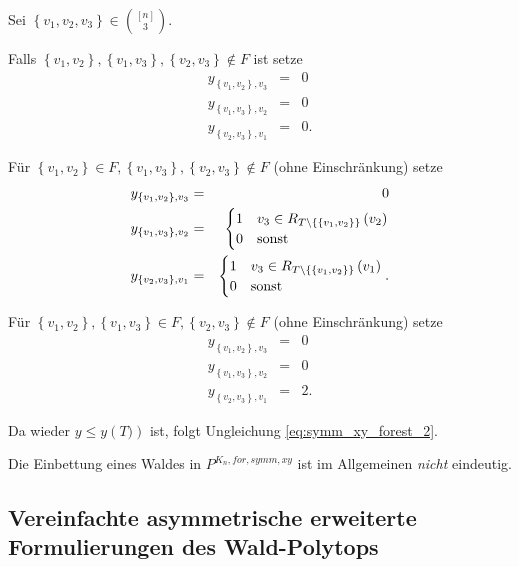 \documentclass[10p,a4paper,BCOR = 12mm, DIV=15]{scrbook}
\begin{document}
{\begin{bew}
Sei $\left\{v_1, v_2, v_3\right\} \in {\left[n\right] \choose 3}$.

Falls $\left\{v_1, v_2\right\}, \left\{v_1, v_3\right\}, \left\{v_2, v_3\right\} \notin   F$ ist setze
\begin{eqnarray*}
y_{\left\{v_1, v_2\right\}, v_3} & = & 0 \\
y_{\left\{v_1, v_3\right\}, v_2} & = & 0 \\
y_{\left\{v_2, v_3\right\}, v_1} & = & 0.
\end{eqnarray*}

Für $\left\{v_1, v_2\right\} \in F, \left\{v_1, v_3\right\}, \left\{v_2, v_3\right\} \notin  F$ (ohne Einschränkung) setze
\begin{eqnarray*}
y_{\left\{v_1, v_2\right\}, v_3} & = & 0 \\
y_{\left\{v_1, v_3\right\}, v_2} & = & \begin{cases}
1 & v_3\in R_{T\backslash \left\{\left\{v_1, v_2\right\}\right\}}\left(v_2\right) \\
0 & \textnormal{sonst}
\end{cases} \\
y_{\left\{v_2, v_3\right\}, v_1} & = & \begin{cases}
1 & v_3\in R_{T\backslash \left\{\left\{v_1, v_2\right\}\right\}}\left(v_1\right) \\
0 & \textnormal{sonst}
\end{cases}.
\end{eqnarray*}

Für $\left\{v_1, v_2\right\}, \left\{v_1, v_3\right\} \in F, \left\{v_2, v_3\right\} \notin  F$ (ohne Einschränkung) setze
\begin{eqnarray*}
y_{\left\{v_1, v_2\right\}, v_3} & = & 0 \\
y_{\left\{v_1, v_3\right\}, v_2} & = & 0 \\
y_{\left\{v_2, v_3\right\}, v_1} & = & 2.
\end{eqnarray*}

Da wieder $y \leq y\left(T)\right)$ ist, folgt Ungleichung \eqref{eq:symm_xy_forest_2}.
\end{bew}

\begin{Kor}
Die Einbettung eines Waldes in $P^{K_n, for, symm, xy}$ ist im Allgemeinen \emph{nicht} eindeutig.
\end{Kor}

\subsection{Vereinfachte asymmetrische erweiterte Formulierungen des Wald-Polytops}

}
\end{document}
